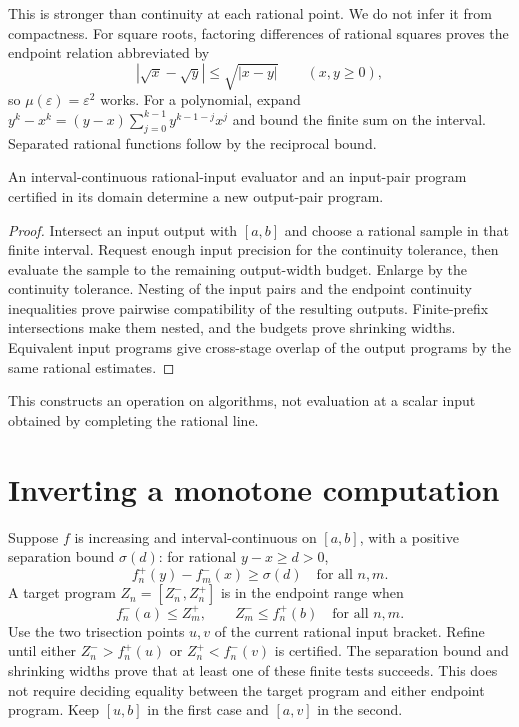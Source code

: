 This is stronger than continuity at each rational point.  We do not infer it
from compactness.  For square roots, factoring differences of rational
squares proves the endpoint relation abbreviated by
\[
 |\sqrt{x}-\sqrt{y}|\le\sqrt{|x-y|}\qquad(x,y\ge0),
\]
so $\mu(\varepsilon)=\varepsilon^2$ works.  For a polynomial, expand
$y^k-x^k=(y-x)\sum_{j=0}^{k-1}y^{k-1-j}x^j$ and bound the finite sum on
the interval.  Separated rational functions follow by the reciprocal bound.

\begin{proposition}\label{prop:computed-inputs}
An interval-continuous rational-input evaluator and an input-pair program
certified in its domain determine a new output-pair program.
\end{proposition}
\begin{proof}
Intersect an input output with $[a,b]$ and choose a rational sample in that
finite interval.  Request enough input precision for the continuity
tolerance, then evaluate the sample to the remaining output-width budget.
Enlarge by the continuity tolerance.  Nesting of the input pairs and the
endpoint continuity inequalities prove pairwise compatibility of the
resulting outputs.  Finite-prefix intersections make them nested, and
the budgets prove shrinking widths.  Equivalent input programs give
cross-stage overlap of the output programs by the same rational estimates.
\end{proof}

This constructs an operation on algorithms, not evaluation at a scalar
input obtained by completing the rational line.

\section{Inverting a monotone computation}
\label{thm:constructive-inverse-function}
Suppose $f$ is increasing and interval-continuous on $[a,b]$, with a
positive separation bound $\sigma(d)$: for rational $y-x\ge d>0$,
\[
 f_n^+(y)-f_m^-(x)\ge\sigma(d)\quad\text{for all }n,m.
\]
A target program $Z_n=[Z_n^-,Z_n^+]$ is in the endpoint range when
\[
 f_n^-(a)\le Z_m^+,\qquad Z_m^-\le f_n^+(b)\quad\text{for all }n,m.
\]
Use the two trisection points $u,v$ of the current rational input bracket.
Refine until either $Z_n^->f_n^+(u)$ or $Z_n^+<f_n^-(v)$ is certified.
The separation bound and shrinking widths prove that at least one of
these finite tests succeeds.  This does not require deciding equality
between the target program and either endpoint program.  Keep $[u,b]$
in the first case and $[a,v]$ in the second.

